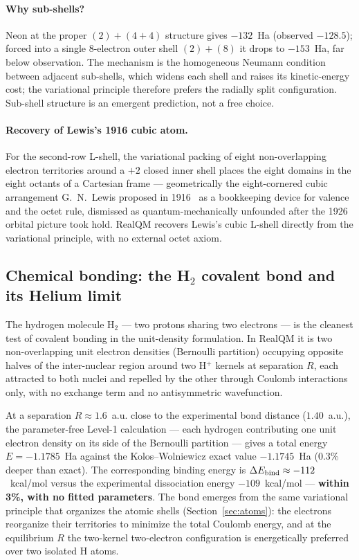 \documentclass[11pt]{article}
\begin{document}
\paragraph{Why sub-shells?}
Neon at the proper $(2)+(4{+}4)$ structure gives $-132$~Ha (observed $-128.5$); forced into a single $8$-electron outer shell $(2)+(8)$ it drops to $-153$~Ha, far below observation. The mechanism is the homogeneous Neumann condition between adjacent sub-shells, which widens each shell and raises its kinetic-energy cost; the variational principle therefore prefers the radially split configuration. Sub-shell structure is an emergent prediction, not a free choice.

\paragraph{Recovery of Lewis's 1916 cubic atom.}
For the second-row L-shell, the variational packing of eight non-overlapping electron territories around a $+2$ closed inner shell places the eight domains in the eight octants of a Cartesian frame --- geometrically the eight-cornered cubic arrangement G.~N.~Lewis proposed in 1916~\cite{Lewis1916} as a bookkeeping device for valence and the octet rule, dismissed as quantum-mechanically unfounded after the 1926 orbital picture took hold. RealQM recovers Lewis's cubic L-shell directly from the variational principle, with no external octet axiom.

\subsection{Chemical bonding: the H$_2$ covalent bond and its Helium limit}\label{sec:h2bond}

The hydrogen molecule H$_2$ --- two protons sharing two electrons --- is the cleanest test of covalent bonding in the unit-density formulation. In RealQM it is two non-overlapping unit electron densities (Bernoulli partition) occupying opposite halves of the inter-nuclear region around two H$^+$ kernels at separation $R$, each attracted to both nuclei and repelled by the other through Coulomb interactions only, with no exchange term and no antisymmetric wavefunction.

At a separation $R \approx 1.6$~a.u. close to the experimental bond distance ($1.40$~a.u.), the parameter-free Level-1 calculation --- each hydrogen contributing one unit electron density on its side of the Bernoulli partition --- gives a total energy $E = -1.1785$~Ha against the Kolos--Wolniewicz exact value $-1.1745$~Ha (0.3\% deeper than exact). The corresponding binding energy is $\Delta E_{\rm bind} \approx -112$~kcal/mol versus the experimental dissociation energy $-109$~kcal/mol --- \textbf{within 3\%, with no fitted parameters}. The bond emerges from the same variational principle that organizes the atomic shells (Section~\ref{sec:atoms}): the electrons reorganize their territories to minimize the total Coulomb energy, and at the equilibrium $R$ the two-kernel two-electron configuration is energetically preferred over two isolated H atoms.
\end{document}

